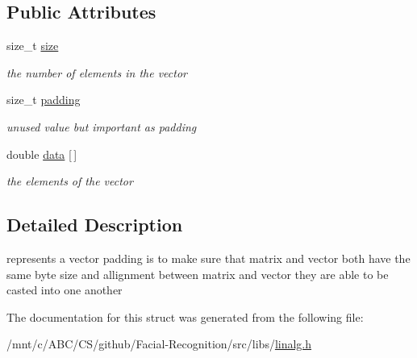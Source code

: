 \subsection*{Public Attributes}
\begin{DoxyCompactItemize}
\item 
\hypertarget{struct__vector_a1ed8dca78f3e589deb8dad9b53aec3fa}{size\-\_\-t \hyperlink{struct__vector_a1ed8dca78f3e589deb8dad9b53aec3fa}{size}}\label{struct__vector_a1ed8dca78f3e589deb8dad9b53aec3fa}

\begin{DoxyCompactList}\small\item\em the number of elements in the vector \end{DoxyCompactList}\item 
\hypertarget{struct__vector_a4165a40cc39bfd874677299c943b290f}{size\-\_\-t \hyperlink{struct__vector_a4165a40cc39bfd874677299c943b290f}{padding}}\label{struct__vector_a4165a40cc39bfd874677299c943b290f}

\begin{DoxyCompactList}\small\item\em unused value but important as padding \end{DoxyCompactList}\item 
\hypertarget{struct__vector_abcf7d1342126a90769b2a05126897859}{double \hyperlink{struct__vector_abcf7d1342126a90769b2a05126897859}{data} \mbox{[}$\,$\mbox{]}}\label{struct__vector_abcf7d1342126a90769b2a05126897859}

\begin{DoxyCompactList}\small\item\em the elements of the vector \end{DoxyCompactList}\end{DoxyCompactItemize}


\subsection{Detailed Description}
represents a vector padding is to make sure that matrix and vector both have the same byte size and allignment between matrix and vector they are able to be casted into one another 

The documentation for this struct was generated from the following file\-:\begin{DoxyCompactItemize}
\item 
/mnt/c/\-A\-B\-C/\-C\-S/github/\-Facial-\/\-Recognition/src/libs/\hyperlink{linalg_8h}{linalg.\-h}\end{DoxyCompactItemize}
